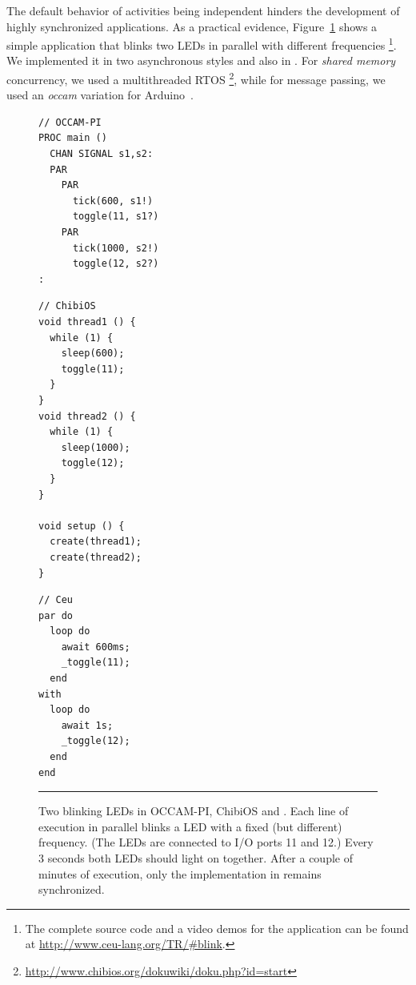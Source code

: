 The default behavior of activities being independent hinders the development of 
highly synchronized applications.
As a practical evidence, Figure~\ref{lst.related.leds} shows a simple 
application that blinks two LEDs in parallel with different frequencies%
\footnote{The complete source code and a video demos for the application can be 
found at \url{http://www.ceu-lang.org/TR/\#blink}.}.
We implemented it in two asynchronous styles and also in \CEU.
For \emph{shared memory} concurrency, we used a multithreaded RTOS%
\footnote{\url{http://www.chibios.org/dokuwiki/doku.php?id=start}}, while for 
message passing, we used an \emph{occam} variation for 
Arduino~\cite{arduino.occam}.

\begin{figure}[t]
\begin{minipage}[t]{0.34\linewidth}
\begin{lstlisting}
// OCCAM-PI
PROC main ()
  CHAN SIGNAL s1,s2:
  PAR
    PAR
      tick(600, s1!)
      toggle(11, s1?)
    PAR
      tick(1000, s2!)
      toggle(12, s2?)
:

\end{lstlisting}
\end{minipage}
%
\begin{minipage}[t]{0.33\linewidth}
\begin{lstlisting}
// ChibiOS
void thread1 () {
  while (1) {
    sleep(600);
    toggle(11);
  }
}
void thread2 () {
  while (1) {
    sleep(1000);
    toggle(12);
  }
}

void setup () {
  create(thread1);
  create(thread2);
}

\end{lstlisting}
\end{minipage}
%
\begin{minipage}[t]{0.31\linewidth}
\begin{lstlisting}
// Ceu
par do
  loop do
    await 600ms;
    _toggle(11);
  end
with
  loop do
    await 1s;
    _toggle(12);
  end
end
\end{lstlisting}
\end{minipage}
%
\rule{14cm}{0.37pt}
\caption{ Two blinking LEDs in OCCAM-PI, ChibiOS and \CEU.\newline
{\small %
Each line of execution in parallel blinks a LED with a fixed (but different) 
frequency.
(The LEDs are connected to I/O ports 11 and 12.)
Every 3 seconds both LEDs should light on together.
After a couple of minutes of execution, only the implementation in \CEU remains 
synchronized.
}%
\label{lst.related.leds}
}
\end{figure}

